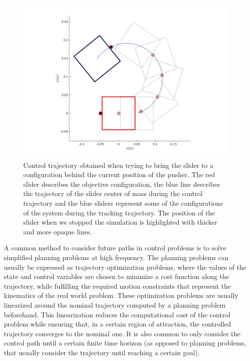 \documentclass[12,twoside]{TFG-GM}
\theoremstyle{definition}
\theoremstyle{remark}
\begin{document}
\begin{figure}[htb!]
\begin{center}
\includegraphics[width=15cm]{underactuation.jpg}
\end{center}
\caption[test caption]{\label{fig:underactuation} \small{Control trajectory obtained when trying to bring the slider to a configuration behind the current position of the pusher. The red slider describes the objective configuration, the blue line describes the trajectory of the slider center of mass during the control trajectory and the blue sliders represent some of the configurations of the system during the tracking trajectory. The position of the slider when we stopped the simulation is highlighted with thicker and more opaque lines.}}
\end{figure}

A common method to consider future paths in control problems is to solve simplified planning problems at high frequency. The planning problems can usually be expressed as trajectory optimization problems, where the values of the state and control variables are chosen to minimize a cost function along the trajectory, while fulfilling the required motion constraints that represent the kinematics of the real world problem. These optimization problems are usually linearized around the nominal trajectory computed by a planning problem beforehand. This linearization reduces the computational cost of the control problem while ensuring that, in a certain region of attraction, the controlled trajectory converges to the nominal one. It is also common to only consider the control path until a certain finite time horizon (as opposed to planning problems, that usually consider the trajectory until reaching a certain goal).
\end{document}
